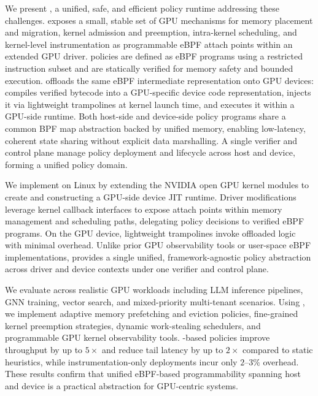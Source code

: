 We present \sys, a unified, safe, and efficient policy runtime addressing these challenges. \sys exposes a small, stable set of GPU mechanisms for memory placement and migration, kernel admission and preemption, intra-kernel scheduling, and kernel-level instrumentation as programmable eBPF attach points within an extended GPU driver. \sys policies are defined as eBPF programs using a restricted instruction subset and are statically verified for memory safety and bounded execution. \sys offloads the same eBPF intermediate representation onto GPU devices: \sys compiles verified bytecode into a GPU-specific device code representation, injects it via lightweight trampolines at kernel launch time, and executes it within a GPU-side runtime. Both host-side and device-side policy programs share a common BPF map abstraction backed by unified memory, enabling low-latency, coherent state sharing without explicit data marshalling. A single verifier and control plane manage policy deployment and lifecycle across host and device, forming a unified policy domain.

We implement \sys on Linux by extending the NVIDIA open GPU kernel modules\cite{nvidia-open-gpu} to create \sysdriver and constructing a GPU-side device JIT runtime. Driver modifications leverage kernel callback interfaces to expose attach points within memory management and scheduling paths, delegating policy decisions to verified eBPF programs. On the GPU device, lightweight trampolines invoke offloaded logic with minimal overhead. Unlike prior GPU observability tools\cite{cupti,villa2019nvbit,neutrino,egpu} or user-space eBPF implementations, \sys provides a single unified, framework-agnostic policy abstraction across driver and device contexts under one verifier and control plane.

We evaluate \sys across realistic GPU workloads including LLM inference pipelines, GNN training, vector search, and mixed-priority multi-tenant scenarios. Using \sys, we implement adaptive memory prefetching and eviction policies, fine-grained kernel preemption strategies, dynamic work-stealing schedulers, and programmable GPU kernel observability tools. \sys-based policies improve throughput by up to $5\times$ and reduce tail latency by up to $2\times$ compared to static heuristics, while instrumentation-only deployments incur only $2$–$3\%$ overhead. These results confirm that unified eBPF-based programmability spanning host and device is a practical abstraction for GPU-centric systems.

